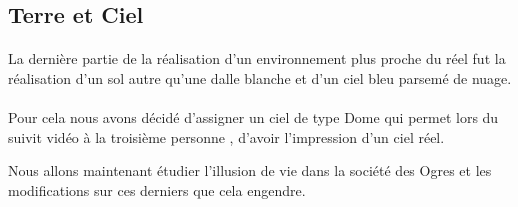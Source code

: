 \subsection{Terre et Ciel}

\paragraph{}
La dernière partie de la réalisation d'un environnement plus proche du réel fut
la réalisation d'un sol autre qu'une dalle blanche et d'un ciel bleu parsemé de
nuage.

\paragraph{}
Pour cela nous avons décidé d'assigner un ciel de type Dome qui permet lors du
suivit vidéo à la troisième personne , d'avoir l'impression d'un ciel réel.

Nous allons maintenant étudier l'illusion de vie dans la société des Ogres et
les modifications sur ces derniers que cela engendre.
